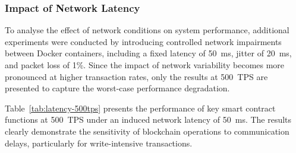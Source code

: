 \documentclass[12pt]{article}
\begin{document}
	\subsubsection{Impact of Network Latency}
	
	To analyse the effect of network conditions on system performance, additional experiments were conducted by introducing controlled network impairments between Docker containers, including a fixed latency of 50~ms, jitter of 20~ms, and packet loss of 1\%. Since the impact of network variability becomes more pronounced at higher transaction rates, only the results at 500~TPS are presented to capture the worst-case performance degradation.
	\begin{table}[h]
		\centering
		\caption{Performance Comparison of Smart Contract Functions at 500 TPS}
		\label{tab:latency-500tps}
	\end{table}
	
	
	Table~\ref{tab:latency-500tps} presents the performance of key smart contract functions at 500~TPS under an induced network latency of 50~ms. The results clearly demonstrate the sensitivity of blockchain operations to communication delays, particularly for write-intensive transactions.
	
\end{document}
